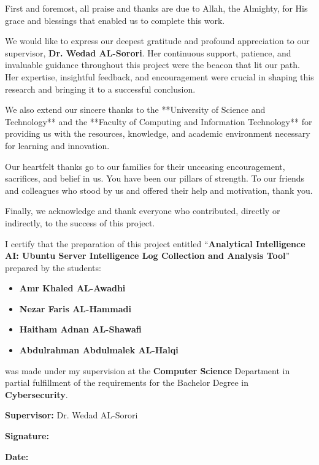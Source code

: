 \documentclass[12pt,a4paper]{report} %
\newenvironment{boxedlist}[1]{%
  \begin{mdframed}[
    linewidth=0.8pt,
    roundcorner=2pt,
    skipabove=10pt,
    skipbelow=14pt,
    innerleftmargin=14pt, innerrightmargin=14pt,
    innertopmargin=8pt, innerbottommargin=12pt,
    frametitle={\Large\bfseries #1},
    frametitlealignment=\center,
    frametitleaboveskip=2pt,
    frametitlebelowskip=8pt
  ]%
}{%
  \end{mdframed}%
}
\begin{document}
\clearpage
{}
\begin{boxedlist}{Acknowledgment}
  First and foremost, all praise and thanks are due to Allah, the Almighty, for His grace and blessings that enabled us to complete this work.

  We would like to express our deepest gratitude and profound appreciation to our supervisor, \textbf{Dr. Wedad AL-Sorori}. Her continuous support, patience, and invaluable guidance throughout this project were the beacon that lit our path. Her expertise, insightful feedback, and encouragement were crucial in shaping this research and bringing it to a successful conclusion.

  We also extend our sincere thanks to the **University of Science and Technology** and the **Faculty of Computing and Information Technology** for providing us with the resources, knowledge, and academic environment necessary for learning and innovation.

  Our heartfelt thanks go to our families for their unceasing encouragement, sacrifices, and belief in us. You have been our pillars of strength. To our friends and colleagues who stood by us and offered their help and motivation, thank you.

  Finally, we acknowledge and thank everyone who contributed, directly or indirectly, to the success of this project.
\end{boxedlist}

\clearpage
{}
\begin{boxedlist}{Supervisor Certification}
  I certify that the preparation of this project entitled ``\textbf{Analytical Intelligence AI: Ubuntu Server Intelligence Log Collection and Analysis Tool}'' prepared by the students:
  \begin{itemize}
      \item \textbf{Amr Khaled AL-Awadhi}
      \item \textbf{Nezar Faris AL-Hammadi}
      \item \textbf{Haitham Adnan AL-Shawafi}
      \item \textbf{Abdulrahman Abdulmalek AL-Halqi}
  \end{itemize}
  was made under my supervision at the \textbf{Computer Science} Department in partial fulfillment of the requirements for the Bachelor Degree in \textbf{Cybersecurity}.
  
  \vspace{2cm}
  \noindent \textbf{Supervisor:} Dr. Wedad AL-Sorori
  
  \vspace{1.5cm}
  \noindent \textbf{Signature:} \makebox[7cm]{\hrulefill}
  
  \vspace{1.5cm}
  \noindent \textbf{Date:} \makebox[4cm]{\hrulefill}
\end{boxedlist}
\end{document}
